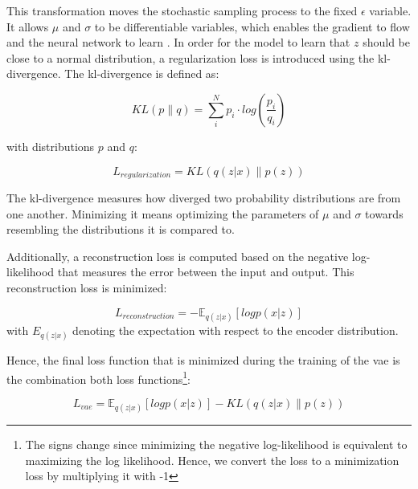 This transformation moves the stochastic sampling process to the fixed $\epsilon$ variable. 
It allows $\mu$ and $\sigma$ to be differentiable variables, which enables the gradient to flow and the neural network to learn \cite{kingma2013AutoEncodingVariationalBayes}.
In order for the model to learn that $z$ should be close to a normal distribution, a regularization loss is introduced using the \gls{kl}-divergence.
The \gls{kl}-divergence is defined as:

\begin{equation}
    \label{eqn:kl-divergence}
    KL(p\parallel q) = \sum_{i}^{N}p_i\cdot log(\frac{p_i}{q_i})
\end{equation}

with distributions $p$ and $q$:

\begin{equation}
    \label{eqn:regularization_loss}
    L_{regularization} = KL(q(z|x) \parallel p(z))
\end{equation}

The \gls{kl}-divergence measures how diverged two probability distributions are from one another.
Minimizing it means optimizing the parameters of $\mu$ and $\sigma$ towards resembling the distributions it is compared to.

Additionally, a reconstruction loss is computed based on the negative log-likelihood that measures the error between the input and output.
This reconstruction loss is minimized:

\begin{equation}
    \label{eqn:reconstruction_loss}
    L_{reconstruction} =-\mathbb{E}_{q(z|x)}[logp(x|z)]
\end{equation}
with $E_{q(z|x)}$ denoting the expectation with respect to the encoder distribution.

Hence, the final loss function that is minimized during the training of the \gls{vae} is the combination both loss functions\footnote{The signs change since minimizing the negative log-likelihood is equivalent to maximizing the log likelihood. Hence, we convert the loss to a minimization loss by multiplying it with -1}:

\begin{equation}
    \label{eqn:vae_loss}
    L_{vae} =\mathbb{E}_{q(z|x)}[logp(x|z)]-KL(q(z|x) \parallel p(z))
\end{equation}

